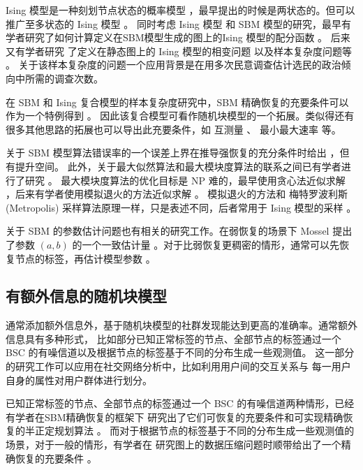 \documentclass{ctexart}
\begin{document}
Ising 模型是一种刻划节点状态的概率模型 \cite{ising1925beitrag}，最早提出的时候是两状态的。但可以推广至多状态的 Ising 模型 \cite{potts1952some}。
同时考虑 Ising 模型 和 SBM 模型的研究，最早有学者研究了如何计算定义在SBM模型生成的图上的Ising 模型的配分函数 \cite{liu2017log}。
后来又有学者研究 了定义在静态图上的 Ising 模型的相变问题 \cite{berthet2019exact} 以及样本复杂度问题等 \cite{ye2020exact}。
关于该样本复杂度的问题一个应用背景是在用多次民意调查估计选民的政治倾向中所需的调查次数。

在 SBM 和 Ising 复合模型的样本复杂度研究中，SBM 精确恢复的充要条件可以作为一个特例得到 \cite{ye2020exact}。
因此该复合模型可看作随机块模型的一个拓展。类似得还有很多其他思路的拓展也可以导出此充要条件，如 互测量 \cite{chen2016information}、 最小最大速率 \cite{zhang2016} 等。

关于 SBM 模型算法错误率的一个误差上界在推导强恢复的充分条件时给出 \cite{abbe2015exact}，但有提升空间。
此外，关于最大似然算法和最大模块度算法的联系之间已有学者进行了研究 \cite{newman2016equivalence}。
最大模块度算法的优化目标是 NP 难的，最早使用贪心法近似求解 \cite{clauset2004finding}，后来有学者使用模拟退火的方法近似求解 \cite{he2016fast}。
模拟退火的方法和 梅特罗波利斯 (Metropolis) 采样算法原理一样，只是表述不同，后者常用于 Ising 模型的采样 \cite{metropolis1953equation}。

关于 SBM 的参数估计问题也有相关的研究工作。在弱恢复的场景下 Mossel 提出了参数 $(a,b)$ 的一个一致估计量
\cite{mossel2015reconstruction}。对于比弱恢复更稠密的情形，通常可以先恢复节点的标签，再估计模型参数
\cite{abbe2015recovering}。

\subsection{有额外信息的随机块模型}
通常添加额外信息外，基于随机块模型的社群发现能达到更高的准确率。通常额外信息具有多种形式，
比如部分已知正常标签的节点、全部节点的标签通过一个 BSC 的有噪信道以及根据节点的标签基于不同的分布生成一些观测值\cite{saad2018community}。
这一部分的研究工作可以应用在社交网络分析中，比如利用用户间的交互关系与
每一用户自身的属性对用户群体进行划分。

已知正常标签的节点、全部节点的标签通过一个 BSC 的有噪信道两种情形，已经有学者在SBM精确恢复的框架下
研究出了它们可恢复的充要条件和可实现精确恢复的半正定规划算法 \cite{esmaeili2019community, esmaeili2019exact}。
而对于根据节点的标签基于不同的分布生成一些观测值的场景，对于一般的情形，有学者在
研究图上的数据压缩问题时顺带给出了一个精确恢复的充要条件 \cite{abbe17sideinfo}。
\end{document}
